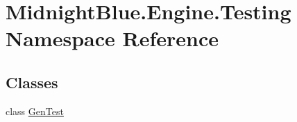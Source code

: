 \hypertarget{namespace_midnight_blue_1_1_engine_1_1_testing}{}\section{Midnight\+Blue.\+Engine.\+Testing Namespace Reference}
\label{namespace_midnight_blue_1_1_engine_1_1_testing}
\subsection*{Classes}
\begin{DoxyCompactItemize}
\item 
class \hyperlink{class_midnight_blue_1_1_engine_1_1_testing_1_1_gen_test}{Gen\+Test}
\end{DoxyCompactItemize}
